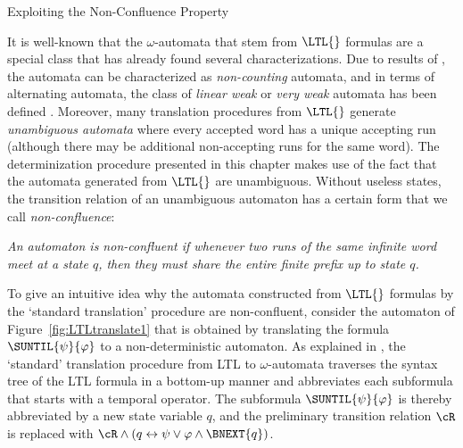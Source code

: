 \documentclass[copyright,creativecommons]{eptcs}
\begin{document}
\begin{section}{Exploiting the Non-Confluence Property}
\label{NonConfluenceProperty}

It is well-known that the $\omega$-automata that stem from $\LTL{}$ formulas are a special class that has already found several characterizations. Due to results of \cite{McPa71}, the automata can be characterized as \emph{non-counting} automata, and in terms of alternating automata, the class of \emph{linear weak} or \emph{very weak} automata has been defined \cite{MeSe03,MuSS86b}. Moreover, many translation procedures from $\LTL{}$ generate {\em unambiguous automata} \cite{CaMi03} where every accepted word has a unique accepting run \cite{Schn03} (although there may be additional non-accepting runs for the same word). The determinization procedure presented in this chapter makes use of the fact that the automata generated from $\LTL{}$ are unambiguous. Without useless states, the transition relation of an unambiguous automaton has a certain form that we call \emph{non-confluence}:

\begin{center}
\begin{minipage}{13cm}
\emph{An automaton is non-confluent if whenever two runs of the same infinite word meet at a state $q$, then they must share the entire finite prefix up to state $q$.}
\end{minipage}
\end{center}

\noindent To give an intuitive idea why the automata constructed from $\LTL{}$ formulas by the `standard translation' procedure are non-confluent, consider the automaton of Figure~\ref{fig:LTLtranslate1} that is obtained by translating the formula $\SUNTIL{\psi}{\varphi}$ to a non-deterministic automaton.
As explained in \cite{Schn01b,Schn03}, the `standard' translation procedure from LTL to $\omega$-automata traverses the syntax tree of the LTL formula in a bottom-up manner and abbreviates each subformula that starts with a temporal operator. The subformula $\SUNTIL{\psi}{\varphi}$ is thereby abbreviated by a new state variable $q$, and the preliminary transition relation $\cR$ is replaced with $\cR\wedge \left(q \leftrightarrow \psi\vee\varphi\wedge\BNEXT{q}\right)$.

\begin{figure}
\centering
{}
\end{figure}
\end{section}
\end{document}
